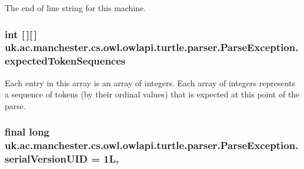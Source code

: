 The end of line string for this machine. \hypertarget{classuk_1_1ac_1_1manchester_1_1cs_1_1owl_1_1owlapi_1_1turtle_1_1parser_1_1_parse_exception_a08ab7f2d8391b1238530a95a82e17dfc}{
\subsubsection[{expected\-Token\-Sequences}]{\setlength{\rightskip}{0pt plus 5cm}int \mbox{[}$\,$\mbox{]}\mbox{[}$\,$\mbox{]} uk.\-ac.\-manchester.\-cs.\-owl.\-owlapi.\-turtle.\-parser.\-Parse\-Exception.\-expected\-Token\-Sequences}}\label{classuk_1_1ac_1_1manchester_1_1cs_1_1owl_1_1owlapi_1_1turtle_1_1parser_1_1_parse_exception_a08ab7f2d8391b1238530a95a82e17dfc}
Each entry in this array is an array of integers. Each array of integers represents a sequence of tokens (by their ordinal values) that is expected at this point of the parse. \hypertarget{classuk_1_1ac_1_1manchester_1_1cs_1_1owl_1_1owlapi_1_1turtle_1_1parser_1_1_parse_exception_a4b0c45b51e29b0e6a41e9ccd47220a17}{
\subsubsection[{serial\-Version\-U\-I\-D}]{\setlength{\rightskip}{0pt plus 5cm}final long uk.\-ac.\-manchester.\-cs.\-owl.\-owlapi.\-turtle.\-parser.\-Parse\-Exception.\-serial\-Version\-U\-I\-D = 1\-L\hspace{0.3cm}{\ttfamily [static]}, {\ttfamily [private]}}}\label{classuk_1_1ac_1_1manchester_1_1cs_1_1owl_1_1owlapi_1_1turtle_1_1parser_1_1_parse_exception_a4b0c45b51e29b0e6a41e9ccd47220a17}
